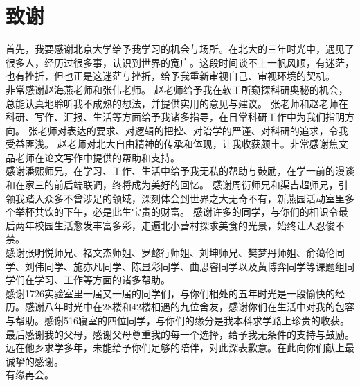 
\chapter{致谢}
首先，我要感谢北京大学给予我学习的机会与场所。在北大的三年时光中，遇见了很多人，经历过很多事，认识到世界的宽广。这段时间谈不上一帆风顺，有迷茫，也有挫折，但也正是这迷茫与挫折，给予我重新审视自己、审视环境的契机。\\
\indent 非常感谢赵海燕老师和张伟老师。
赵老师给予我在软工所窥探科研奥秘的机会，总能认真地聆听我不成熟的想法，并提供实用的意见与建议。
张老师和赵老师在科研、写作、汇报、生活等方面给予我诸多指导，在日常科研工作中为我们指明方向。
张老师对表达的要求、对逻辑的把控、对治学的严谨、对科研的追求，令我受益匪浅。
赵老师对北大自由精神的传承和体现，让我收获颇丰。非常感谢焦文品老师在论文写作中提供的帮助和支持。\\
\indent 感谢潘熙师兄，在学习、工作、生活中给予我无私的帮助与鼓励，在学一前的漫谈和在家三的前后端联调，终将成为美好的回忆。
感谢周衍师兄和渠吉超师兄，引领我踏入众多不曾涉足的领域，深刻体会到世界之大无奇不有，新燕园活动室里多个举杯共饮的下午，必是此生宝贵的财富。
感谢许多的同学，与你们的相识令最后两年校园生活愈发丰富多彩，走遍北小营村探求美食的光景，始终让人忍俊不禁。\\
\indent 感谢张明悦师兄、褚文杰师姐、罗懿行师姐、刘坤师兄、樊梦丹师姐、俞蔼伦同学、刘伟同学、施亦凡同学、陈显彩同学、曲思睿同学以及黄博弈同学等课题组同学们在学习、工作等方面的诸多帮助。\\
\indent 感谢1726实验室里一届又一届的同学们，与你们相处的五年时光是一段愉快的经历。感谢八年时光中在28楼和42楼相遇的九位舍友，感谢你们在生活中对我的包容与帮助。感谢516寝室的四位同学，与你们的缘分是我本科求学路上珍贵的收获。\\
\indent 最后感谢我的父母，感谢父母尊重我的每一个选择，给予我无条件的支持与鼓励。远在他乡求学多年，未能给予你们足够的陪伴，对此深表歉意。在此向你们献上最诚挚的感谢。\\
\indent 有缘再会。

